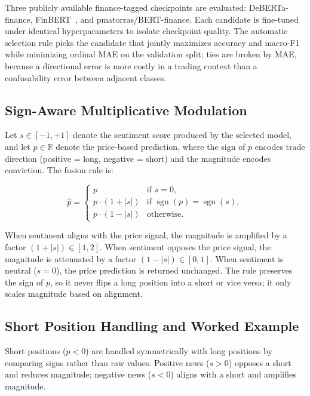 \documentclass[conference]{IEEEtran}
\begin{document}
Three publicly available finance-tagged checkpoints are evaluated:
DeBERTa-finance, FinBERT~\cite{araci2019finbert}, and
pmatorras/BERT-finance. Each candidate is fine-tuned under identical
hyperparameters to isolate checkpoint quality. The automatic selection rule
picks the candidate that jointly maximizes accuracy and macro-F1 while
minimizing ordinal MAE on the validation split; ties are broken by MAE,
because a directional error is more costly in a trading context than a
confusability error between adjacent classes.

\subsection{Sign-Aware Multiplicative Modulation}
\label{sec:modulation}

Let $s \in [-1, +1]$ denote the sentiment score produced by the selected
model, and let $p \in \mathbb{R}$ denote the price-based prediction, where
the sign of $p$ encodes trade direction (positive = long, negative = short)
and the magnitude encodes conviction. The fusion rule is:

\begin{equation}
\hat{p} =
\begin{cases}
p & \text{if } s = 0, \\
p \cdot (1 + |s|) & \text{if } \operatorname{sgn}(p) = \operatorname{sgn}(s), \\
p \cdot (1 - |s|) & \text{otherwise.}
\end{cases}
\label{eq:modulation}
\end{equation}

When sentiment aligns with the price signal, the magnitude is amplified by a
factor $(1 + |s|) \in [1, 2]$. When sentiment opposes the price signal, the
magnitude is attenuated by a factor $(1 - |s|) \in [0, 1]$. When sentiment
is neutral ($s = 0$), the price prediction is returned unchanged. The rule
preserves the sign of $p$, so it never flips a long position into a short or
vice versa; it only scales magnitude based on alignment.

\subsection{Short Position Handling and Worked Example}
\label{sec:worked}

Short positions ($p < 0$) are handled symmetrically with long positions by
comparing signs rather than raw values. Positive news ($s > 0$) opposes a
short and reduces magnitude; negative news ($s < 0$) aligns with a short and
amplifies magnitude.
\end{document}
